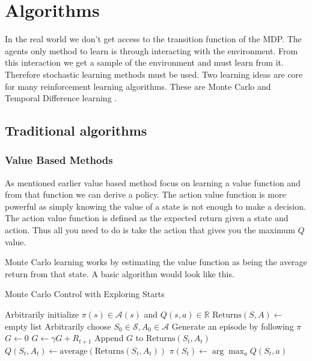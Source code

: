 \chapter{Algorithms}\label{C:algorithms}

In the real world we don't get access to the transition function of the MDP. The agents only method to learn is through interacting with the environment. From this interaction we get a sample of the environment and must learn from it. Therefore stochastic learning methods must be used. Two learning ideas are core for many reinforcement learning algorithms. These are Monte Carlo \cite{suttonReinforcementLearningSecond2018} and Temporal Difference learning \cite{suttonTemporalCreditAssignment1984} \cite{suttonLearningPredictMethods1988}.

\section{Traditional algorithms}

\subsection{Value Based Methods}

As mentioned earlier value based method focus on learning a value function and from that function we can derive a policy. The action value function is more powerful as simply knowing the value of a state is not enough to make a decision. The action value function is defined as the expected return given a state and action. Thus all you need to do is take the action that gives you the maximum $Q$ value.


Monte Carlo learning works by estimating the value function as being the average return from that state.  A basic algorithm would look like this.

\begin{algorithm}
\caption{Monte Carlo Control with Exploring Starts}
\begin{algorithmic}[1]
\State Arbitrarily initialize $\pi(s) \in \mathcal{A}(s)$ and $Q(s,a) \in \mathbb{R}$
\State $\text{Returns}(S,A) \gets$ empty list
    \State Arbitrarily choose $S_0 \in \mathcal{S}, A_0 \in \mathcal{A}$
    \State Generate an episode by following $\pi$
    \State $G \gets 0$
        \State $G \gets \gamma G + R_{t+1}$
            \State Append $G$ to $\text{Returns}(S_t, A_t)$
            \State $Q(S_t, A_t) \gets \text{average}(\text{Returns}(S_t, A_t))$
            \State $\pi(S_t) \gets \arg\max_{a} Q(S_t, a)$
        \EndIf
    \EndFor
\EndFor
\end{algorithmic}
\end{algorithm}


